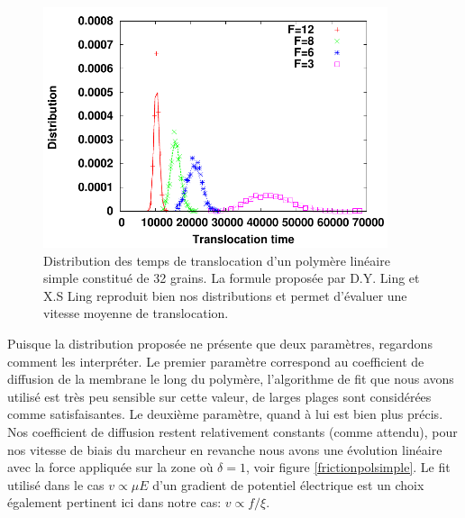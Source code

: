 \begin{figure}[H]
\begin{center}
\includegraphics[width=0.9\textwidth]{distribpolsimple.pdf}


\caption[Distribution des temps de translocation du polymère simple]{Distribution des temps de translocation d'un polymère linéaire simple constitué de 32 grains. La formule proposée par D.Y. Ling et X.S Ling \cite{Ling2013} reproduit bien nos distributions et permet d'évaluer une vitesse moyenne de translocation.}
\label{distribpolsimple}
\end{center}
\end{figure}

Puisque la distribution proposée ne présente que deux paramètres, regardons comment les interpréter. Le premier paramètre correspond au coefficient de diffusion de la membrane le long du polymère, l'algorithme de fit que nous avons utilisé est très peu sensible sur cette valeur, de larges plages sont considérées comme satisfaisantes. Le deuxième paramètre, quand à lui est bien plus précis. Nos coefficient de diffusion restent relativement constants (comme attendu),  pour nos vitesse de biais du marcheur en revanche nous avons une évolution linéaire avec la force appliquée sur la zone où $\delta=1$, voir figure \ref{frictionpolsimple}. Le fit utilisé dans le cas $v \propto \mu E$ d'un gradient de potentiel électrique \cite{Ling2013} est un choix également pertinent ici dans notre cas: $v \propto f/\xi$.




